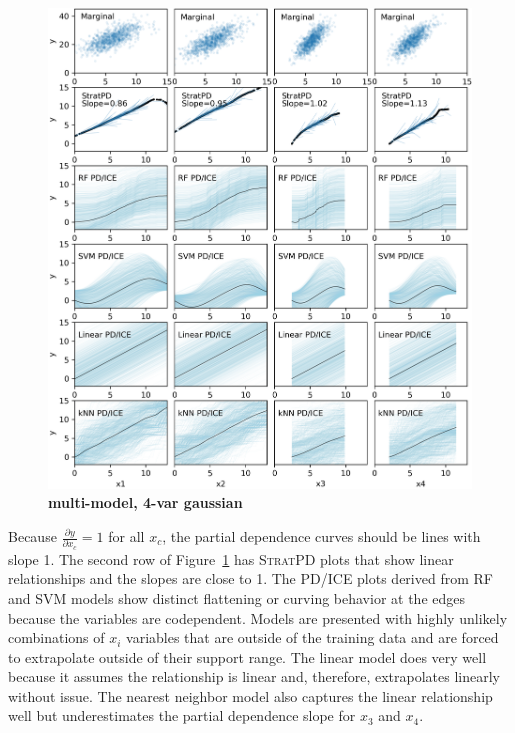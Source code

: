 \documentclass[12pt]{article}
\newcommand{\figref}[1]{Figure~\ref{#1}}
\newcommand{\spd}{\fontfamily{cmr}\textsc{\small StratPD}}
\begin{document}
\begin{figure}[htbp]
\begin{center}
\includegraphics[scale=0.6]{images/multivar_multimodel_normal.png}
\caption{{\bf  multi-model, 4-var gaussian}}
\label{fig:4var}
\end{center}
\end{figure}

Because $\frac{\partial y}{\partial x_{c}} = 1$ for all $x_c$, the partial dependence curves should be lines with slope 1.  The second row of \figref{fig:4var} has \spd{} plots that show linear relationships and the slopes are close to 1.  The PD/ICE plots derived from RF and SVM models show distinct flattening or curving behavior at the edges because the variables are codependent. Models are presented with highly unlikely combinations of $x_i$ variables that are outside of the training data and are forced to extrapolate outside of their support range.  The linear model does very well because it assumes the relationship is linear and, therefore, extrapolates linearly without issue. The nearest neighbor model also captures the linear relationship well but underestimates the partial dependence slope for $x_3$ and $x_4$.
 
\end{document}
